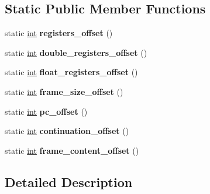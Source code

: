 \subsection*{Static Public Member Functions}
\begin{DoxyCompactItemize}
\item 
\mbox{\label{classv8_1_1internal_1_1FrameDescription_aca4e7553fe5d6b6ee5cde8e13ec0f83f}} 
static \mbox{\hyperlink{classint}{int}} {\bfseries registers\+\_\+offset} ()
\item 
\mbox{\label{classv8_1_1internal_1_1FrameDescription_ad153c3c5f0a21b9bec32568e73d93d15}} 
static \mbox{\hyperlink{classint}{int}} {\bfseries double\+\_\+registers\+\_\+offset} ()
\item 
\mbox{\label{classv8_1_1internal_1_1FrameDescription_abd61acd88376ba352e47f1deb6271991}} 
static \mbox{\hyperlink{classint}{int}} {\bfseries float\+\_\+registers\+\_\+offset} ()
\item 
\mbox{\label{classv8_1_1internal_1_1FrameDescription_a06dd3cd8ae0d2dfb9da60e5244ccce61}} 
static \mbox{\hyperlink{classint}{int}} {\bfseries frame\+\_\+size\+\_\+offset} ()
\item 
\mbox{\label{classv8_1_1internal_1_1FrameDescription_ade843b58760cc40ad09c3eb3d0376281}} 
static \mbox{\hyperlink{classint}{int}} {\bfseries pc\+\_\+offset} ()
\item 
\mbox{\label{classv8_1_1internal_1_1FrameDescription_a555ca7a3c4118a4bdff2936a7048754e}} 
static \mbox{\hyperlink{classint}{int}} {\bfseries continuation\+\_\+offset} ()
\item 
\mbox{\label{classv8_1_1internal_1_1FrameDescription_a6758b613b805fc441d2def08e7a5eabe}} 
static \mbox{\hyperlink{classint}{int}} {\bfseries frame\+\_\+content\+\_\+offset} ()
\end{DoxyCompactItemize}


\subsection{Detailed Description}


